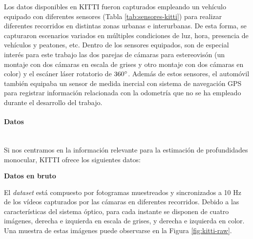 
Los datos disponibles en KITTI fueron capturados empleando un vehículo equipado con diferentes sensores (Tabla \ref{tab:sensores-kitti}) para realizar diferentes recorridos en distintas zonas urbanas e interurbanas. De esta forma, se capturaron escenarios variados en múltiples condiciones de luz, hora, presencia de vehículos y peatones, etc. Dentro de los sensores equipados, son de especial interés para este trabajo las dos parejas de cámaras para estereovisón (un montaje con dos cámaras en escala de grises y otro montaje con dos cámaras en color) y el escáner láser rotatorio de $360\degree$. Además de estos sensores, el automóvil también equipaba un sensor de medida inercial con sistema de navegación GPS para registrar información relacionada con la odometría que no se ha empleado durante el desarrollo del trabajo.

 
 

\paragraph{Datos}\mbox{}\\
Si nos centramos en la información relevante para la estimación de profundidades monocular, KITTI ofrece los siguientes datos:

\textbf{Datos en bruto}

El \textit{dataset} está compuesto por fotogramas muestreados y sincronizados a 10 Hz de los vídeos capturados por las cámaras en diferentes recorridos. Debido a las características del sistema óptico, para cada instante se disponen de cuatro imágenes, derecha e izquierda en escala de grises, y derecha e izquierda en color. Una muestra de estas imágenes puede observarse en la Figura \ref{fig:kitti-raw}.

